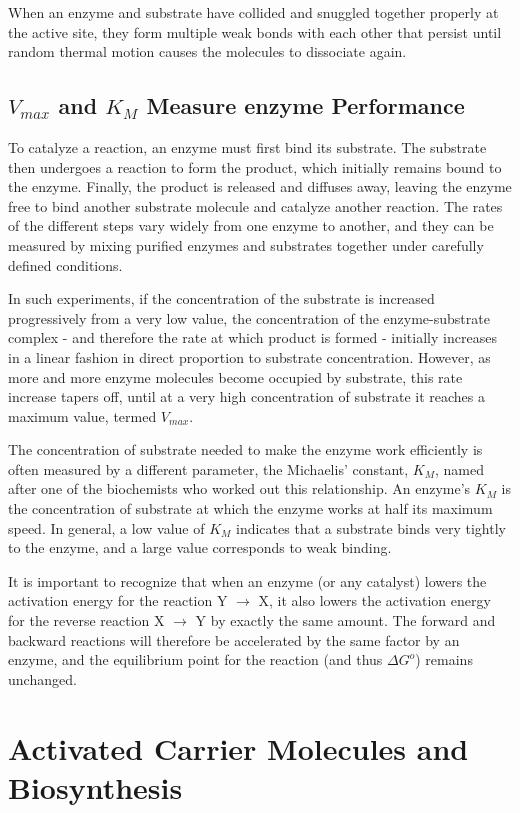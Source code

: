 When an enzyme and substrate have collided and snuggled together
properly at the active site, they form multiple weak bonds with each
other that persist until random thermal motion causes the molecules to
dissociate again.

\subsection{$V_{max}$ and $K_{M}$ Measure enzyme Performance}

To catalyze a reaction, an enzyme must first bind its substrate. The substrate
then undergoes a reaction to form the product, which initially
remains bound to the enzyme. Finally, the product is released and diffuses
away, leaving the enzyme free to bind another substrate molecule
and catalyze another reaction. The rates of the different
steps vary widely from one enzyme to another, and they can be measured
by mixing purified enzymes and substrates together under carefully
defined conditions.

In such experiments, if the concentration of the substrate is increased
progressively from a very low value, the concentration of the enzyme-substrate
complex - and therefore the rate at which product is formed - initially increases
in a linear fashion in direct proportion to substrate concentration.
However, as more and more enzyme molecules become occupied by substrate,
this rate increase tapers off, until at a very high concentration of substrate
it reaches a maximum value, termed $V_{max}$.

The concentration of substrate needed to make the enzyme work efficiently
is often measured by a different parameter, the Michaelis’ constant,
$K_M$, named after one of the biochemists who worked out this relationship.
An enzyme’s $K_M$ is the concentration of substrate at which the enzyme
works at half its maximum speed. In general, a low
value of $K_M$ indicates that a substrate binds very tightly to the enzyme,
and a large value corresponds to weak binding.

It is important to recognize that when an enzyme (or any catalyst) lowers
the activation energy for the reaction Y $\rightarrow$ X, it also lowers the activation
energy for the reverse reaction X $\rightarrow$ Y by exactly the same amount.
The forward and backward reactions will therefore be accelerated by the same factor
by an enzyme, and the equilibrium point for the reaction (and thus $\Delta G^{o}$)
remains unchanged.

\section{Activated Carrier Molecules and Biosynthesis}

